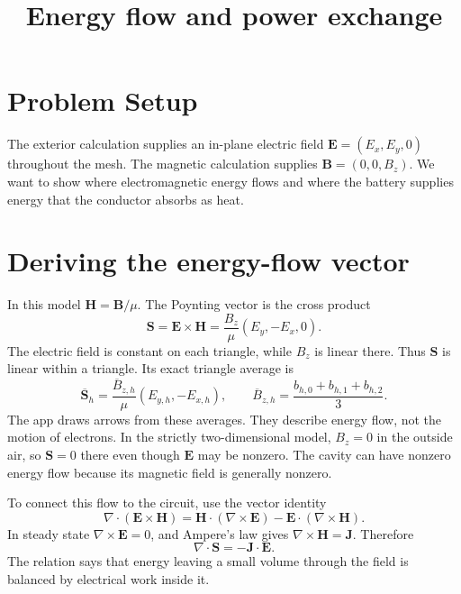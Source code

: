 \documentclass[11pt]{article}
\title{Energy flow and power exchange}
\author{}
\date{}
\begin{document}
\maketitle

\section{Problem Setup}
The exterior calculation supplies an in-plane electric field
$\bm E=(E_x,E_y,0)$ throughout the mesh. The magnetic calculation
supplies $\bm B=(0,0,B_z)$. We want to show where electromagnetic
energy flows and where the battery supplies energy that the
conductor absorbs as heat.

\section{Deriving the energy-flow vector}
In this model $\bm H=\bm B/\mu$. The Poynting vector is the
cross product
\begin{equation}
 \bm S=\bm E\times\bm H
      =\frac{B_z}{\mu}(E_y,-E_x,0).
 \label{eq:poynting}
\end{equation}
The electric field is constant on each triangle, while $B_z$
is linear there. Thus $\bm S$ is linear within a triangle.
Its exact triangle average is
\begin{equation}
 \overline{\bm S}_h
 =\frac{\overline B_{z,h}}{\mu}(E_{y,h},-E_{x,h}),
 \qquad
 \overline B_{z,h}
 =\frac{b_{h,0}+b_{h,1}+b_{h,2}}{3}.
\end{equation}
The app draws arrows from these averages. They describe energy
flow, not the motion of electrons. In the strictly two-dimensional
model, $B_z=0$ in the outside air, so $\bm S=0$ there even though
$\bm E$ may be nonzero. The cavity can have nonzero energy flow
because its magnetic field is generally nonzero.

To connect this flow to the circuit, use the vector identity
\begin{equation}
 \nabla\cdot(\bm E\times\bm H)
 =\bm H\cdot(\nabla\times\bm E)
  -\bm E\cdot(\nabla\times\bm H).
\end{equation}
In steady state $\nabla\times\bm E=0$, and Ampere's law gives
$\nabla\times\bm H=\bm J$. Therefore
\begin{equation}
 \nabla\cdot\bm S=-\bm J\cdot\bm E.
 \label{eq:balance}
\end{equation}
The relation says that energy leaving a small volume through
the field is balanced by electrical work inside it.
\end{document}
